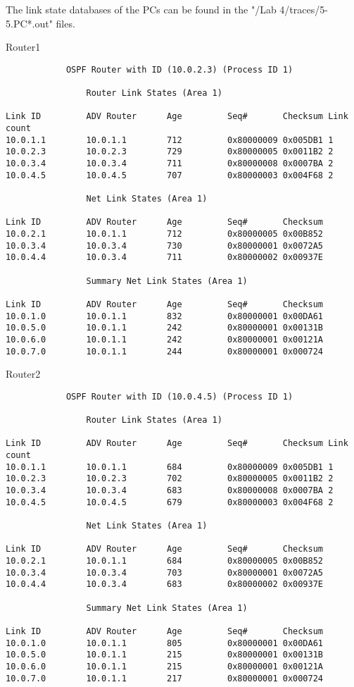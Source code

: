 The link state databases of the PCs can be found in the "/Lab 4/traces/5-5.PC*.out" files.

Router1
\begin{lstlisting}
            OSPF Router with ID (10.0.2.3) (Process ID 1)

                Router Link States (Area 1)

Link ID         ADV Router      Age         Seq#       Checksum Link count
10.0.1.1        10.0.1.1        712         0x80000009 0x005DB1 1
10.0.2.3        10.0.2.3        729         0x80000005 0x0011B2 2
10.0.3.4        10.0.3.4        711         0x80000008 0x0007BA 2
10.0.4.5        10.0.4.5        707         0x80000003 0x004F68 2

                Net Link States (Area 1)

Link ID         ADV Router      Age         Seq#       Checksum
10.0.2.1        10.0.1.1        712         0x80000005 0x00B852
10.0.3.4        10.0.3.4        730         0x80000001 0x0072A5
10.0.4.4        10.0.3.4        711         0x80000002 0x00937E

                Summary Net Link States (Area 1)

Link ID         ADV Router      Age         Seq#       Checksum
10.0.1.0        10.0.1.1        832         0x80000001 0x00DA61
10.0.5.0        10.0.1.1        242         0x80000001 0x00131B
10.0.6.0        10.0.1.1        242         0x80000001 0x00121A
10.0.7.0        10.0.1.1        244         0x80000001 0x000724
\end{lstlisting}

Router2
\begin{lstlisting}
            OSPF Router with ID (10.0.4.5) (Process ID 1)

                Router Link States (Area 1)

Link ID         ADV Router      Age         Seq#       Checksum Link count
10.0.1.1        10.0.1.1        684         0x80000009 0x005DB1 1
10.0.2.3        10.0.2.3        702         0x80000005 0x0011B2 2
10.0.3.4        10.0.3.4        683         0x80000008 0x0007BA 2
10.0.4.5        10.0.4.5        679         0x80000003 0x004F68 2

                Net Link States (Area 1)

Link ID         ADV Router      Age         Seq#       Checksum
10.0.2.1        10.0.1.1        684         0x80000005 0x00B852
10.0.3.4        10.0.3.4        703         0x80000001 0x0072A5
10.0.4.4        10.0.3.4        683         0x80000002 0x00937E

                Summary Net Link States (Area 1)

Link ID         ADV Router      Age         Seq#       Checksum
10.0.1.0        10.0.1.1        805         0x80000001 0x00DA61
10.0.5.0        10.0.1.1        215         0x80000001 0x00131B
10.0.6.0        10.0.1.1        215         0x80000001 0x00121A
10.0.7.0        10.0.1.1        217         0x80000001 0x000724
\end{lstlisting}

